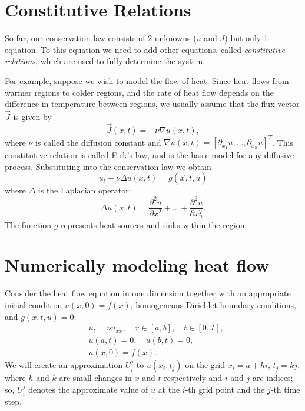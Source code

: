 \section*{Constitutive Relations}
So far, our conservation law consists of 2 unknowns ($u$ and $J$) but only 1 equation.
To this equation we need to add other equations, called \textit{constitutive relations}, which are used to fully determine the system.

For example, suppose we wish to model the flow of heat.
Since heat flows from warmer regions to colder regions, and the rate of heat flow depends on the difference in temperature between regions, we usually assume that the flux vector $\vec{J}$ is given by
\[\vec{J}(x,t) = -\nu \nabla u(x,t),\]
where $\nu$ is called the diffusion constant and $\nabla u(x,t) = \left[ \partial_{x_1}u, \dots, \partial_{x_n}u\right]^T$.
This constitutive relation is called Fick's law, and is the basic model for any diffusive process.
Substituting into the conservation law we obtain
\[u_t -\nu \Delta u(x,t) = g(\vec{x},t,u)\]
where $\Delta$ is the Laplacian operator:
\[\Delta u(x,t) = \frac{\partial ^2 u}{\partial x_1^2}+\dots+ \frac{\partial ^2 u}{\partial x_n^2}.\]
The function $g$ represents heat sources and sinks within the region.

\section*{Numerically modeling heat flow}
Consider the heat flow equation in one dimension together with an appropriate initial condition \(u(x,0)=f(x)\), homogeneous Dirichlet boundary conditions, and \(g(x,t,u)=0\):
\begin{align*}
	&{ } u_t = \nu u_{xx}, \quad x \in [a,b],\quad t \in [0,T], \\
	&{ } u(a,t) = 0,\quad u(b,t) = 0,\\
	&{ } u(x,0) = f(x).
\end{align*}
We will create an approximation $U^j_i$ to $u(x_i,t_j)$ on the grid $x_i = a +  hi$, $t_j = kj$, where $h$ and $k$ are small changes in $x$ and $t$ respectively and $i$ and $j$ are indices; so, \(U_i^j\) denotes the approximate value of $u$ at the $i$-th grid point and the $j$-th time step.

